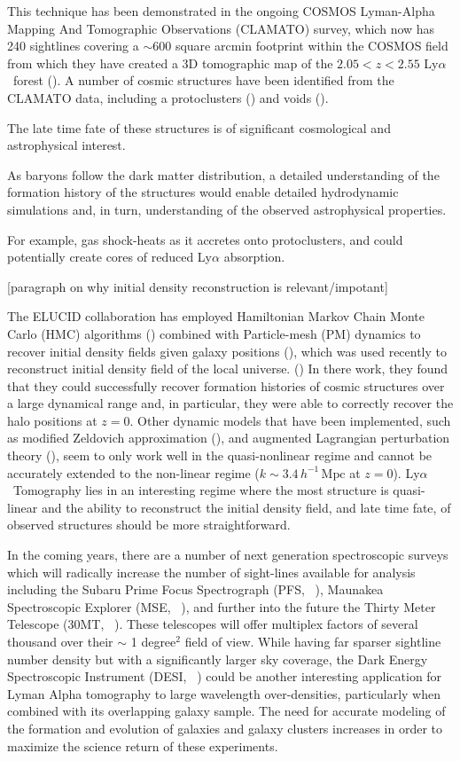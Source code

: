\documentclass[times]{aastex62}
\newcommand{\mpc}{\ensuremath{\, h^{-1}\,\mathrm{Mpc} }}
\newcommand{\lya}{Ly$\alpha$}
\begin{document}
This technique has been demonstrated in the ongoing COSMOS Lyman-Alpha Mapping And 
Tomographic Observations (CLAMATO) survey, which now has 240 sightlines covering a $\sim 600$ square arcmin footprint within 
the COSMOS field from which they have created a 3D tomographic map of the $2.05<z<2.55$ \lya\ forest (\cite{Lee2017}). A number of cosmic structures have been identified from the CLAMATO data, including a protoclusters (\cite{2015StarkProtocluster}) and voids (\cite{2018Krolewski}).

The late time fate of these structures is of significant cosmological and astrophysical interest. 

As baryons follow the dark matter distribution, a detailed understanding of the formation history of the structures would enable detailed hydrodynamic simulations and, in turn, understanding of the observed astrophysical properties. 

For example, gas shock-heats as it accretes onto protoclusters, and could potentially create cores of reduced Ly$\alpha$ absorption.

[paragraph on why initial density reconstruction is relevant/impotant]

The ELUCID collaboration has employed Hamiltonian Markov Chain Monte Carlo (HMC) algorithms (\cite{HMC}) combined with
Particle-mesh (PM) dynamics to recover initial density fields given galaxy positions (\cite{ECULID1}), which was used recently to reconstruct initial density field of the local universe. (\cite{ECULID3}) In there work, they found that they could successfully recover formation histories of cosmic structures over a large dynamical range and, in particular, they were able to correctly recover the halo positions at $z=0$. Other dynamic models that have been implemented, such as modified Zeldovich approximation (\cite{TZ}), and augmented Lagrangian perturbation theory (\cite{KH}), seem to only work well in the quasi-nonlinear regime and cannot be accurately extended to the non-linear regime ($k \sim 3.4 \mpc$ at $z=0$). \lya\ Tomography lies in an interesting regime where the most structure is quasi-linear and the ability to reconstruct the initial density field, and late time fate, of observed structures should be more straightforward.

In the coming years, there are a number of next generation spectroscopic surveys which will radically increase the number of sight-lines available for analysis including the Subaru Prime Focus Spectrograph (PFS, ~\cite{subaru}), Maunakea Spectroscopic Explorer (MSE, ~\cite{2016MSE}), and further into the future the Thirty Meter Telescope (30MT, ~\cite{2015TMT}). These telescopes will offer multiplex factors of several thousand over their $\sim $ 1 degree$^2$ field of view. While having far sparser sightline number density but with a significantly larger sky coverage, the Dark Energy Spectroscopic Instrument (DESI, ~\cite{desi}) could be another interesting application for Lyman Alpha tomography to large wavelength over-densities, particularly when combined with its overlapping galaxy sample. The need for accurate modeling of the formation and evolution of galaxies and galaxy clusters increases in order to maximize the science return of these experiments.
\end{document}
